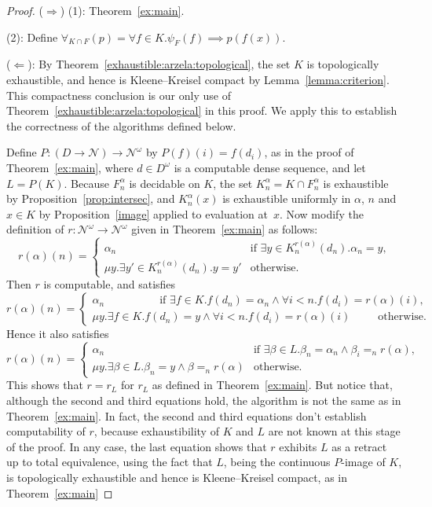 \documentclass{LMCS}
\newcommand{\myomega}{\omega}
\newcommand{\pN}{\mathcal{N}}
\begin{document}
\begin{proof}
($\Rightarrow$) (1): Theorem~\ref{ex:main}.

\medskip

(2): Define $\forall_{K \cap F}(p) = \forall {f \in K}.  \psi_F(f)
\implies p(f(x))$.

\medskip

($\Leftarrow$): By Theorem~\ref{exhaustible:arzela:topological}, the
set $K$ is topologically exhaustible, and hence is Kleene--Kreisel
compact by Lemma~\ref{lemma:criterion}. This compactness conclusion is
our only use of Theorem~\ref{exhaustible:arzela:topological} in this
proof. We apply this to establish the correctness of the algorithms
defined below.

Define $P \colon (D \to \pN) \to \pN^\myomega$ by $P(f)(i) = f(d_i)$, as
in the proof of Theorem~\ref{ex:main}, where $d \in D^\myomega$ is a
computable dense sequence, and let $L=P(K)$.  Because
$F_n^\alpha$ is decidable on $K$, the set $K_n^\alpha = K \cap F_n^\alpha$ is
exhaustible by Proposition~\ref{prop:intersec}, and $K_n^\alpha(x)$ is
exhaustible uniformly in $\alpha$, $n$ and $x \in K$ by
Proposition~\ref{image} applied to evaluation at~$x$.
Now modify the definition of $r \colon \pN^\myomega \to \pN^\myomega$
given in Theorem~\ref{ex:main} as follows:
\[
 r(\alpha)(n) = 
 \begin{cases}
   \alpha_n & \text{if $\exists y \in K_n^{r(\alpha)}(d_n). \alpha_n = y$,} \\
   \mu y. \exists y' \in K_n^{r(\alpha)}(d_n). y = y' & \text{otherwise.}
 \end{cases}
\]
Then $r$ is computable, and satisfies
\[
 r(\alpha)(n) = 
 \begin{cases}
   \alpha_n \qquad \qquad \quad \text{if $\exists f \in K. f(d_n) = \alpha_n \wedge \forall i < n. f(d_i) = r(\alpha)(i) $,} \\
   \mu y. \exists f \in K. f(d_n) = y \wedge \forall i < n. f(d_i) = r(\alpha)(i)  \qquad\,\,\,
   \text{otherwise.}
 \end{cases}
\]
Hence it also satisfies
\[
 r(\alpha)(n) = 
 \begin{cases}
   \alpha_n & \text{if $\exists \beta \in L. \beta_n = \alpha_n \wedge \beta_i =_n r(\alpha) $,} \\
   \mu y. \exists \beta \in L. \beta_n = y \wedge \beta =_n r(\alpha)  & 
   \text{otherwise.}
 \end{cases}
\]
This shows that $r=r_L$ for $r_L$ as defined in Theorem~\ref{ex:main}.
But notice that, although the second and third equations hold, the
algorithm is not the same as in Theorem~\ref{ex:main}.  In fact, the
second and third equations don't establish computability of $r$,
because exhaustibility of $K$ and $L$ are not known at this stage of
the proof. In any case, the last equation shows that $r$ exhibits $L$
as a retract up to total equivalence, using the fact that $L$, being
the continuous $P$-image of $K$, is topologically exhaustible and
hence is Kleene--Kreisel compact, as in Theorem~\ref{ex:main}


\end{proof}
\end{document}
